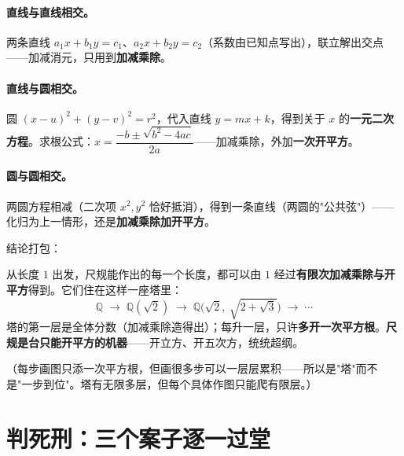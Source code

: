 \paragraph{直线与直线相交。}两条直线 $a_1 x + b_1 y = c_1$、$a_2 x + b_2 y = c_2$（系数由已知点写出），联立解出交点——加减消元，只用到\textbf{加减乘除}。

\paragraph{直线与圆相交。}圆 $(x-u)^2 + (y-v)^2 = r^2$，代入直线 $y = mx + k$，得到关于 $x$ 的\textbf{一元二次方程}。求根公式：$x = \dfrac{-b \pm \sqrt{b^2 - 4ac}}{2a}$——加减乘除，外加\textbf{一次开平方}。

\paragraph{圆与圆相交。}两圆方程相减（二次项 $x^2, y^2$ 恰好抵消），得到一条直线（两圆的"公共弦"）——化归为上一情形，还是\textbf{加减乘除加开平方}。

结论打包：

\begin{dingli}[可作图数的生产线]
从长度 $1$ 出发，尺规能作出的每一个长度，都可以由 $1$ 经过\textbf{有限次加减乘除与开平方}得到。它们住在这样一座塔里：
\[
\mathbb{Q} \;\to\; \mathbb{Q}(\sqrt2) \;\to\; \mathbb{Q}\bigl(\sqrt2,\ \sqrt{2+\sqrt3}\bigr) \;\to\; \cdots
\]
塔的第一层是全体分数（加减乘除造得出）；每升一层，只许\textbf{多开一次平方根}。\textbf{尺规是台只能开平方的机器}——开立方、开五次方，统统超纲。
\end{dingli}

（每步画图只添一次平方根，但画很多步可以一层层累积——所以是"塔"而不是"一步到位"。塔有无限多层，但每个具体作图只能爬有限层。）

\section{判死刑：三个案子逐一过堂}

